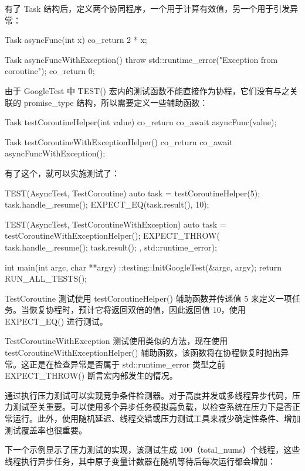 有了 Task 结构后，定义两个协同程序，一个用于计算有效值，另一个用于引发异常：

\begin{cpp}
Task asyncFunc(int x) {
    co_return 2 * x;
}

Task asyncFuncWithException() {
    throw std::runtime_error("Exception from coroutine");
    co_return 0;
}
\end{cpp}

由于 GoogleTest 中 TEST() 宏内的测试函数不能直接作为协程，它们没有与之关联的 promise\_type 结构，所以需要定义一些辅助函数：

\begin{cpp}
Task testCoroutineHelper(int value) {
    co_return co_await asyncFunc(value);
}

Task testCoroutineWithExceptionHelper() {
    co_return co_await asyncFuncWithException();
}
\end{cpp}

有了这个，就可以实施测试了：

\begin{cpp}
TEST(AsyncTest, TestCoroutine) {
    auto task = testCoroutineHelper(5);
    task.handle_.resume();
    EXPECT_EQ(task.result(), 10);
}

TEST(AsyncTest, TestCoroutineWithException) {
    auto task = testCoroutineWithExceptionHelper();
    EXPECT_THROW({
            task.handle_.resume();
            task.result();
        },
        std::runtime_error);
}

int main(int argc, char **argv) {
    ::testing::InitGoogleTest(&argc, argv);
    return RUN_ALL_TESTS();
}
\end{cpp}

TestCoroutine 测试使用 testCoroutineHelper() 辅助函数并传递值 5 来定义一项任务。当恢复协程时，预计它将返回双倍的值，因此返回值 10，使用 EXPECT\_EQ() 进行测试。

TestCoroutineWithException 测试使用类似的方法，现在使用 testCoroutineWithExceptionHelper() 辅助函数，该函数将在协程恢复时抛出异常。这正是在检查异常是否属于 std::runtime\_error 类型之前 EXPECT\_THROW() 断言宏内部发生的情况。


通过执行压力测试可以实现竞争条件检测器。对于高度并发或多线程异步代码，压力测试至关重要。可以使用多个异步任务模拟高负载，以检查系统在压力下是否正常运行。此外，使用随机延迟、线程交错或压力测试工具来减少确定性条件、增加测试覆盖率也很重要。

下一个示例显示了压力测试的实现，该测试生成 100（total\_nums）个线程，这些线程执行异步任务，其中原子变量计数器在随机等待后每次运行都会增加：

